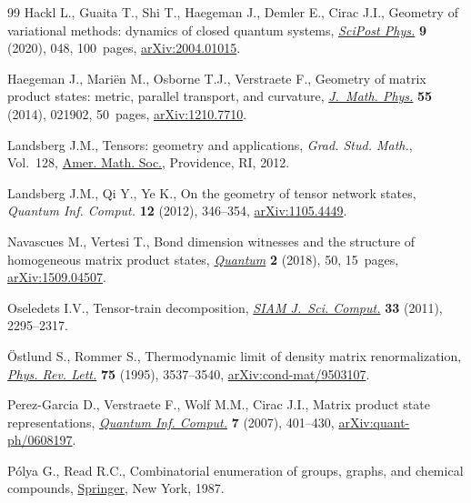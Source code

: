 \begin{thebibliography}{99}
Hackl L., Guaita T., Shi T., Haegeman J., Demler E., Cirac J.I., Geometry of
  variational methods: dynamics of closed quantum systems, \href{https://doi.org/10.21468/scipostphys.9.4.048}{\textit{SciPost
  Phys.}} \textbf{9} (2020), 048, 100~pages, \href{https://arxiv.org/abs/2004.01015}{arXiv:2004.01015}.

Haegeman J., Mari\"en M., Osborne T.J., Verstraete F., Geometry of matrix
  product states: metric, parallel transport, and curvature, \href{https://doi.org/10.1063/1.4862851}{\textit{J.~Math.
  Phys.}} \textbf{55} (2014), 021902, 50~pages, \href{https://arxiv.org/abs/1210.7710}{arXiv:1210.7710}.

Landsberg J.M., Tensors: geometry and applications, \textit{Grad. Stud. Math.},
  Vol.~128, \href{https://doi.org/10.1090/gsm/128}{Amer. Math. Soc.}, Providence, RI, 2012.

Landsberg J.M., Qi Y., Ye K., On the geometry of tensor network states,
  \textit{Quantum Inf. Comput.} \textbf{12} (2012), 346--354,
  \href{https://arxiv.org/abs/:1105.4449}{arXiv:1105.4449}.

Navascues M., Vertesi T., Bond dimension witnesses and the structure of
  homogeneous matrix product states, \href{https://doi.org/10.22331/q-2018-01-31-50}{\textit{Quantum}} \textbf{2} (2018), 50,
  15~pages, \href{https://arxiv.org/abs/1509.04507}{arXiv:1509.04507}.

Oseledets I.V., Tensor-train decomposition, \href{https://doi.org/10.1137/090752286}{\textit{SIAM J.~Sci. Comput.}}
  \textbf{33} (2011), 2295--2317.

\"Ostlund S., Rommer S., Thermodynamic limit of density matrix renormalization,
  \href{https://doi.org/10.1103/PhysRevLett.75.3537}{\textit{Phys. Rev. Lett.}} \textbf{75} (1995), 3537--3540,
  \href{https://arxiv.org/abs/cond-mat/9503107}{arXiv:cond-mat/9503107}.

Perez-Garcia D., Verstraete F., Wolf M.M., Cirac J.I., Matrix product state
  representations, \href{http://hdl.handle.net/1854/LU-8589272}{\textit{Quantum Inf. Comput.}} \textbf{7} (2007), 401--430,
  \href{https://arxiv.org/abs/quant-ph/0608197}{arXiv:quant-ph/0608197}.

P\'olya G., Read R.C., Combinatorial enumeration of groups, graphs, and
  chemical compounds, \href{https://doi.org/10.1007/978-1-4612-4664-0}{Springer}, New York, 1987.


\end{thebibliography}

